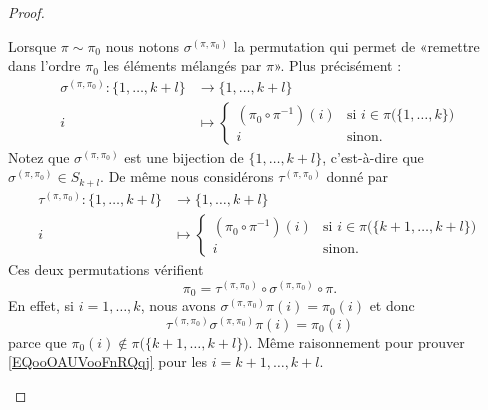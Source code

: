 \begin{proof}
\begin{subproof}
		Lorsque \( \pi\sim\pi_0\) nous notons \( \sigma^{(\pi,\pi_0)}\) la permutation qui permet de «remettre dans l'ordre \( \pi_0\) les éléments mélangés par \( \pi\)». Plus précisément :
		\begin{equation}		\label{EQooMKNVooNbbNwk}
			\begin{aligned}
				\sigma^{(\pi,\pi_0)}\colon \{ 1,\ldots,k+l \} & \to \{ 1,\ldots,k+l \}                                                           \\
				i                                             & \mapsto \begin{cases}
					                                                        (\pi_0\circ\pi^{-1})(i) & \text{si } i\in\pi\big( \{ 1,\ldots,k \} \big) \\
					                                                        i                       & \text{sinon.}
				                                                        \end{cases}
			\end{aligned}
		\end{equation}
		Notez que \( \sigma^{(\pi,\pi_0)}\) est une bijection de \( \{ 1,\ldots,k+l \}\), c'est-à-dire que \( \sigma^{(\pi,\pi_0)}\in S_{k+l}\). De même nous considérons \( \tau^{(\pi,\pi_0)}\) donné par
		\begin{equation}
			\begin{aligned}
				\tau^{(\pi,\pi_0)}\colon \{ 1,\ldots,k+l \} & \to \{ 1,\ldots,k+l \}                                                               \\
				i                                           & \mapsto \begin{cases}
					                                                      (\pi_0\circ\pi^{-1})(i) & \text{si } i\in\pi\big( \{ k+1,\ldots,k+l \} \big) \\
					                                                      i                       & \text{sinon.}
				                                                      \end{cases}
			\end{aligned}
		\end{equation}
		Ces deux permutations vérifient
		\begin{equation}		\label{EQooOAUVooFnRQqj}
			\pi_0=\tau^{(\pi,\pi_0)}\circ\sigma^{(\pi,\pi_0)}\circ\pi.
		\end{equation}
		En effet, si \( i=1,\ldots,k\), nous avons \( \sigma^{(\pi,\pi_0)}\pi(i)=\pi_0(i)\) et donc
		\begin{equation}
			\tau^{(\pi,\pi_0)}\sigma^{(\pi,\pi_0)}\pi(i)=\pi_0(i)
		\end{equation}
		parce que \( \pi_0(i)\notin\pi\big( \{ k+1,\ldots,k+l \} \big)\). Même raisonnement pour prouver \eqref{EQooOAUVooFnRQqj} pour les \( i=k+1,\ldots,k+l\).


\end{subproof}
\end{proof}
